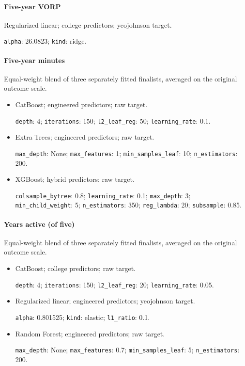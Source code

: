 \paragraph{Five-year VORP} Regularized linear; college predictors; yeojohnson target.\par {\small\raggedright \texttt{alpha}: 26.0823; \texttt{kind}: ridge.\par}
\paragraph{Five-year minutes} Equal-weight blend of three separately fitted finalists, averaged on the original outcome scale.
\begin{itemize}\small\raggedright
\item CatBoost; engineered predictors; raw target.\par \texttt{depth}: 4; \texttt{iterations}: 150; \texttt{l2\_leaf\_reg}: 50; \texttt{learning\_rate}: 0.1.
\item Extra Trees; engineered predictors; raw target.\par \texttt{max\_depth}: None; \texttt{max\_features}: 1; \texttt{min\_samples\_leaf}: 10; \texttt{n\_estimators}: 200.
\item XGBoost; hybrid predictors; raw target.\par \texttt{colsample\_bytree}: 0.8; \texttt{learning\_rate}: 0.1; \texttt{max\_depth}: 3; \texttt{min\_child\_weight}: 5; \texttt{n\_estimators}: 350; \texttt{reg\_lambda}: 20; \texttt{subsample}: 0.85.
\end{itemize}
\paragraph{Years active (of five)} Equal-weight blend of three separately fitted finalists, averaged on the original outcome scale.
\begin{itemize}\small\raggedright
\item CatBoost; college predictors; raw target.\par \texttt{depth}: 4; \texttt{iterations}: 150; \texttt{l2\_leaf\_reg}: 20; \texttt{learning\_rate}: 0.05.
\item Regularized linear; engineered predictors; yeojohnson target.\par \texttt{alpha}: 0.801525; \texttt{kind}: elastic; \texttt{l1\_ratio}: 0.1.
\item Random Forest; engineered predictors; raw target.\par \texttt{max\_depth}: None; \texttt{max\_features}: 0.7; \texttt{min\_samples\_leaf}: 5; \texttt{n\_estimators}: 200.
\end{itemize}
